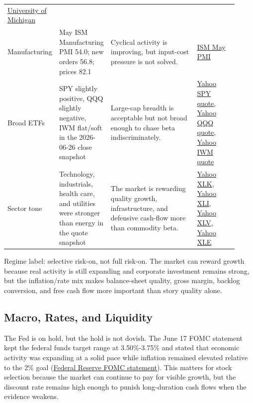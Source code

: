 \documentclass[
  9pt,
]{article}
\begin{document}
\begin{longtable}[]{@{}L{0.14\linewidth}L{0.22\linewidth}L{0.38\linewidth}L{0.18\linewidth}@{}}
\href{https://www.sca.isr.umich.edu/}{University of Michigan} \\
Manufacturing & May ISM Manufacturing PMI 54.0; new orders 56.8; prices
82.1 & Cyclical activity is improving, but input-cost pressure is not
solved. &
\href{https://www.prnewswire.com/news-releases/manufacturing-pmi-at-54-may-2026-ism-manufacturing-pmi-report-302786165.html}{ISM
May PMI} \\
Broad ETFs & SPY slightly positive, QQQ slightly negative, IWM flat/soft
in the 2026-06-26 close snapshot & Large-cap breadth is acceptable but
not broad enough to chase beta indiscriminately. &
\href{https://finance.yahoo.com/quote/SPY/}{Yahoo SPY quote},
\href{https://finance.yahoo.com/quote/QQQ/}{Yahoo QQQ quote},
\href{https://finance.yahoo.com/quote/IWM/}{Yahoo IWM quote} \\
Sector tone & Technology, industrials, health care, and utilities were
stronger than energy in the quote snapshot & The market is rewarding
quality growth, infrastructure, and defensive cash-flow more than
commodity beta. & \href{https://finance.yahoo.com/quote/XLK/}{Yahoo
XLK}, \href{https://finance.yahoo.com/quote/XLI/}{Yahoo XLI},
\href{https://finance.yahoo.com/quote/XLV/}{Yahoo XLV},
\href{https://finance.yahoo.com/quote/XLE/}{Yahoo XLE} \\
\bottomrule
\end{longtable}

Regime label: selective risk-on, not full risk-on. The market can reward
growth because real activity is still expanding and corporate investment
remains strong, but the inflation/rate mix makes balance-sheet quality,
gross margin, backlog conversion, and free cash flow more important than
story quality alone.

\hypertarget{macro-rates-and-liquidity}{%
\subsection{Macro, Rates, and
Liquidity}\label{macro-rates-and-liquidity}}

The Fed is on hold, but the hold is not dovish. The June 17 FOMC
statement kept the federal funds target range at 3.50\%-3.75\% and
stated that economic activity was expanding at a solid pace while
inflation remained elevated relative to the 2\% goal
(\href{https://www.federalreserve.gov/newsevents/pressreleases/monetary20260617a.htm}{Federal
Reserve FOMC statement}). This matters for stock selection because the
market can continue to pay for visible growth, but the discount rate
remains high enough to punish long-duration cash flows when the evidence
weakens.
\end{document}
